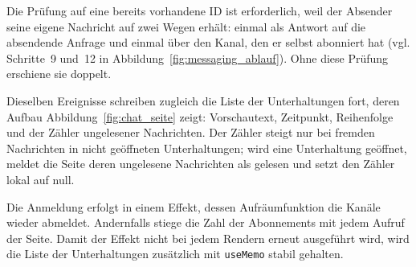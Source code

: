 Die Prüfung auf eine bereits vorhandene ID ist erforderlich, weil der
Absender seine eigene Nachricht auf zwei Wegen erhält: einmal als
Antwort auf die absendende Anfrage und einmal über den Kanal, den er
selbst abonniert hat (vgl. Schritte~9 und~12 in
Abbildung~\ref{fig:messaging_ablauf}). Ohne diese Prüfung erschiene
sie doppelt.

Dieselben Ereignisse schreiben zugleich die Liste der Unterhaltungen
fort, deren Aufbau Abbildung~\ref{fig:chat_seite} zeigt: Vorschautext,
Zeitpunkt, Reihenfolge und der Zähler ungelesener Nachrichten. Der
Zähler steigt nur bei fremden Nachrichten in nicht geöffneten
Unterhaltungen; wird eine Unterhaltung geöffnet, meldet die Seite
deren ungelesene Nachrichten als gelesen und setzt den Zähler lokal
auf null.

Die Anmeldung erfolgt in einem Effekt, dessen Aufräumfunktion die
Kanäle wieder abmeldet. Andernfalls stiege die Zahl der Abonnements
mit jedem Aufruf der Seite. Damit der Effekt nicht bei jedem Rendern
erneut ausgeführt wird, wird die Liste der Unterhaltungen zusätzlich
mit \texttt{useMemo} stabil gehalten.